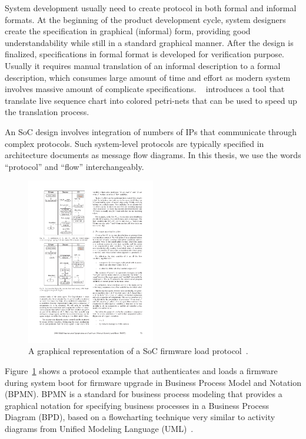 \documentclass[12pt,frontmatter,copyright,thesis]{usfmanus}
\begin{document}
System development usually need to create protocol
in both formal and informal formats. 
At the beginning of the product development cycle, 
system designers create the specification
in graphical (informal) form,
providing good understandability while still
in a standard graphical manner.
After the design is finalized, specifications in formal format is developed
for verification purpose.
Usually it requires manual translation of an informal description to a formal description, 
which 
consumes large amount of time and effort
as modern system involves massive amount of complicate specifications. 
 ~\cite{lsctocpn} introduces a tool that translate live sequence chart
into colored petri-nets that can be used to
speed up the translation process.

 An SoC design involves integration of numbers of IPs that
communicate through complex protocols.  Such system-level
protocols are typically specified in architecture documents
as message flow diagrams. In this thesis, we use the words
``protocol'' and ``flow'' interchangeably.

\begin{figure}[h]
\centering
\includegraphics[width=0.5\textwidth]{figures/bpmn-flow-ex}
\caption{A graphical representation of a SoC firmware load protocol~\cite{Krstic14HOST}.}
\label{flowa}
\end{figure}

Figure~\ref{flowa} shows a protocol example that
authenticates and loads a firmware during system boot for
firmware upgrade in Business Process Model and Notation (BPMN). 
BPMN is a standard for business process modeling that provides a graphical notation for
 specifying business processes in a Business Process Diagram (BPD),
 based on a flowcharting technique very similar to activity diagrams from Unified Modeling Language (UML)~\cite{white2004process}.
 
\end{document}
